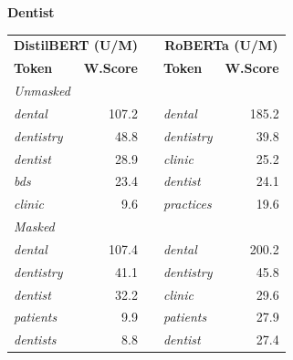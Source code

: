 \documentclass[11pt]{article}
\begin{document}
\vspace{4pt}\noindent\textbf{Dentist}
\begin{center}\scriptsize
\begin{tabular}{lrllr}
\toprule
\multicolumn{2}{c}{\textbf{DistilBERT (U/M)}} & & \multicolumn{2}{c}{\textbf{RoBERTa (U/M)}} \\
\textbf{Token} & \textbf{W.Score} & & \textbf{Token} & \textbf{W.Score} \\
\midrule
\multicolumn{5}{l}{\textit{Unmasked}} \\
\emph{dental} & 107.2 & & \emph{dental} & 185.2 \\
\emph{dentistry} & 48.8 & & \emph{dentistry} & 39.8 \\
\emph{dentist} & 28.9 & & \emph{clinic} & 25.2 \\
\emph{bds} & 23.4 & & \emph{dentist} & 24.1 \\
\emph{clinic} & 9.6 & & \emph{practices} & 19.6 \\
\multicolumn{5}{l}{\textit{Masked}} \\
\emph{dental} & 107.4 & & \emph{dental} & 200.2 \\
\emph{dentistry} & 41.1 & & \emph{dentistry} & 45.8 \\
\emph{dentist} & 32.2 & & \emph{clinic} & 29.6 \\
\emph{patients} & 9.9 & & \emph{patients} & 27.9 \\
\emph{dentists} & 8.8 & & \emph{dentist} & 27.4 \\
\bottomrule
\end{tabular}
\end{center}
\end{document}
